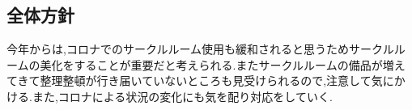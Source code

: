 \subsection*{全体方針}


今年からは,コロナでのサークルルーム使用も緩和されると思うためサークルルームの美化をすることが重要だと考えられる.またサークルルームの備品が増えてきて整理整頓が行き届いていないところも見受けられるので,注意して気にかける.また,コロナによる状況の変化にも気を配り対応をしていく.
